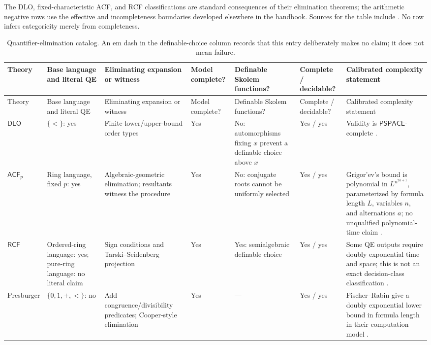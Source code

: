 The DLO, fixed-characteristic ACF, and RCF classifications are standard
consequences of their elimination theorems; the arithmetic negative rows use
the effective and incompleteness boundaries developed elsewhere in the
handbook.  Sources for the table include
  \cite{Marker2002,Steinitz1910,Hodges1993,Presburger1929,Shoenfield1967,Godel1931,
FerranteRackoff1979,Kozen1980}.  No row infers categoricity merely from
completeness.

\begin{landscape}
\begingroup\tiny\setlength{\tabcolsep}{2pt}
\begin{longtable}{@{}p{.65in}p{1.10in}p{1.20in}p{.60in}p{.70in}p{.80in}p{2.10in}@{}}
\caption{Quantifier-elimination catalog.  An em dash in the
definable-choice column records that this entry deliberately makes no claim;
it does not mean failure.}
\label{tab:p03-qe-catalog}\\
\toprule
Theory & Base language and literal QE & Eliminating expansion or witness & Model complete? & Definable Skolem functions? & Complete / decidable? & Calibrated complexity statement \\
\midrule\endfirsthead
\toprule
Theory & Base language and literal QE & Eliminating expansion or witness & Model complete? & Definable Skolem functions? & Complete / decidable? & Calibrated complexity statement \\
\midrule\endhead
\(\mathsf{DLO}\) & \(\{<\}\): yes & Finite lower/upper-bound order types & Yes & No: automorphisms fixing \(x\) prevent a definable choice above \(x\) & Yes / yes & Validity is \(\mathsf{PSPACE}\)-complete \cite{Kozen2006}. \\
\addlinespace
\(\mathsf{ACF}_p\) & Ring language, fixed \(p\): yes & Algebraic-geometric elimination; resultants witness the procedure & Yes & No: conjugate roots cannot be uniformly selected & Yes / yes & Grigor'ev's bound is polynomial in \(L^{n^{2a+1}}\), parameterized by formula length \(L\), variables \(n\), and alternations \(a\); no unqualified polynomial-time claim \cite{Grigoriev1987}. \\
\addlinespace
\(\mathsf{RCF}\) & Ordered-ring language: yes; pure-ring language: no literal claim & Sign conditions and Tarski--Seidenberg projection & Yes & Yes: semialgebraic definable choice & Yes / yes & Some QE outputs require doubly exponential time and space; this is not an exact decision-class classification \cite{DavenportHeintz1988}. \\
\addlinespace
Presburger & \(\{0,1,+,<\}\): no & Add congruence/divisibility predicates; Cooper-style elimination & Yes & --- & Yes / yes & Fischer--Rabin give a doubly exponential lower bound in formula length in their computation model \cite{FischerRabin1974}. \\

\end{longtable}
\end{landscape}
